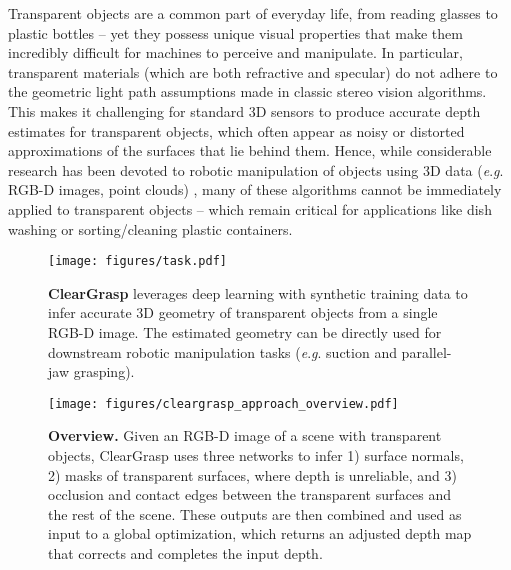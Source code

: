 \documentclass[letterpaper, 10 pt, conference]{ieeeconf}
\newcommand{\eg}{\textit{e}.\textit{g}. }
\begin{document}
Transparent objects are a common part of everyday life, from reading glasses to plastic bottles -- yet they possess unique visual properties that make them incredibly difficult for machines to perceive and manipulate. 
In particular, transparent materials (which are both refractive and specular) do not adhere to the geometric light path assumptions made in classic stereo vision algorithms. This makes it challenging for standard 3D sensors to produce accurate depth estimates for transparent objects, which often appear as noisy or distorted approximations of the surfaces that lie behind them. Hence, while considerable research has been devoted to robotic manipulation of objects using 3D data (\eg RGB-D images, point clouds) \cite{ten2018using,zeng2018robotic,mahler2017dex}, many of these algorithms cannot be immediately applied to transparent objects -- which remain critical for applications like dish washing or sorting/cleaning plastic containers.

\begin{figure}[t]
    \centering
    \texttt{[image: figures/task.pdf]}
\caption{\textbf{ClearGrasp} leverages deep learning with synthetic training data to infer accurate 3D geometry of transparent objects from a single RGB-D image. The estimated geometry can be directly used for downstream robotic manipulation tasks (\eg suction and parallel-jaw grasping).}
    \label{fig:robot_grasping}
    \vspace{-5mm}
\end{figure}

\begin{figure*}[t]
    \centering
    \texttt{[image: figures/cleargrasp\_approach\_overview.pdf]}
    \caption{\label{fig:method} \textbf{Overview.} 
  Given an RGB-D image of a scene with transparent objects, ClearGrasp uses three networks to infer 1) surface normals, 2) masks of transparent surfaces, where depth is unreliable, and 3) occlusion and contact edges between the transparent surfaces and the rest of the scene. 
These outputs are then combined and used as input to a global optimization, which returns an adjusted depth map that corrects and completes the input depth. 
}
    \vspace{-4mm}
\end{figure*}
\end{document}
